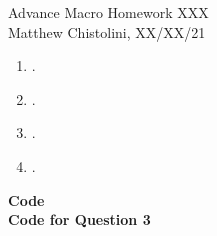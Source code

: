 \documentclass[12pt,oneside,reqno]{amsart}
\begin{document}
\begin{center}
    \Huge{Advance Macro Homework XXX}\\
    \large{Matthew Chistolini, XX/XX/21}
\end{center}
\vspace{-.3cm}
\begin{enumerate}
\item . \\
    
\item .\\
    
\item .\\
    
\item .\\
    
\end{enumerate}
{\Large\bf Code}\\
\textbf{Code for Question 3}

\end{document}
